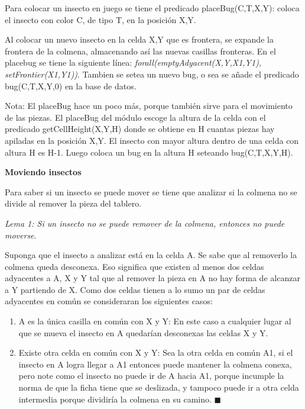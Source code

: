 \documentclass[12pt,letterpaper]{article}
\begin{document}
	 Para colocar un insecto en juego se tiene el predicado placeBug(C,T,X,Y): coloca el insecto con color C, de tipo T, en la posici\'on X,Y.
	 
	 Al colocar un nuevo insecto en la celda X,Y que es frontera, se expande la frontera de la colmena, almacenando as\'i las nuevas casillas fronteras. En el placebug se tiene la siguiente l\'inea: \textit{ forall(emptyAdyacent(X,Y,X1,Y1), setFrontier(X1,Y1))}. Tambien se setea un nuevo bug, o sea se a\~nade el predicado bug(C,T,X,Y,0) en la base de datos.
	 
	 Nota: El placeBug hace un poco m\'as, porque tambi\'en sirve para el movimiento de las piezas. El placeBug del m\'odulo escoge la altura de la celda con el predicado getCellHeight(X,Y,H) donde se obtiene en H cuantas piezas hay apiladas en la posici\'on X,Y. El insecto con mayor altura dentro de una celda con altura H es H-1. Luego coloca un bug en la altura H seteando bug(C,T,X,Y,H).
	 
	\begin{flushleft}
	 	\textbf{Moviendo insectos}
	 \end{flushleft} 
 	Para saber si un insecto se puede mover se tiene que analizar si la colmena no se divide al remover la pieza del tablero. 
 	
 	\textit{Lema 1: Si un insecto no se puede remover de la colmena, entonces no puede moverse}.
 	
 	Suponga que el insecto a analizar est\'a en la celda A. Se sabe que al removerlo la colmena queda desconexa. Eso significa que existen al menos dos celdas adyacentes a A, X y Y tal que al remover la pieza en A no hay forma de alcanzar a Y partiendo de X. Como dos celdas tienen a lo sumo un par de celdas adyacentes en com\'un se consideraran los siguientes casos:
 	\begin{enumerate}
 		\item A es la \'unica casilla en com\'un con X y Y: En este caso a cualquier lugar al que se mueva el insecto en A quedar\'ian desconexas las celdas X y Y.
 		\item Existe otra celda en com\'un con X y Y: Sea la otra celda en com\'un A1, si el insecto en A logra llegar a A1 entonces puede mantener la colmena conexa, pero note como el insecto no puede ir de A hacia A1, porque incumple la norma de que la ficha tiene que se deslizada, y tampoco puede ir a otra celda intermedia porque dividir\'ia la colmena en su camino. $\blacksquare$

 	\end{enumerate}
 	
\end{document}

